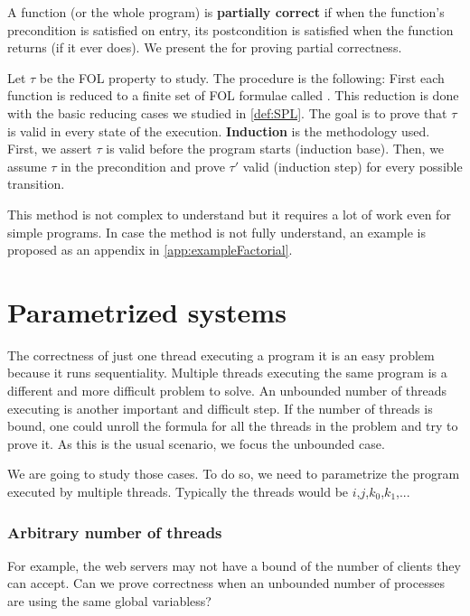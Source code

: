 A function (or the whole program) is \textbf{partially correct} if when the function's precondition is satisfied on entry, its postcondition is satisfied when the function returns (if it ever does).
%
We present the  for proving partial correctness.


Let $\tau$ be the \gls{FOL} property to study. 
%
The procedure is the following:
%
First each function is reduced to a finite set of \gls{FOL} formulae called .
%
This reduction is done with the basic reducing cases we studied in \ref{def:SPL}.
%
The goal is to prove that $\tau$ is valid in every state of the execution.
%
\textbf{Induction} is the methodology used.
%
First, we assert $\tau$ is valid before the program starts (induction base).
%
Then, we assume $\tau$ in the precondition and prove $\tau'$ valid (induction step) for every possible transition.

This method is not complex to understand but it requires a lot of work even for simple programs. 
%
In case the method is not fully understand, an example is proposed as an appendix in \ref{app:exampleFactorial}.



\section{Parametrized systems}

The correctness of just one thread executing a program it is an easy problem because it runs sequentiality.
%
Multiple threads executing the same program is a different and more difficult problem to solve.
%
An unbounded number of threads executing is another important and difficult step.
%
If the number of threads is bound, one could unroll the formula for all the threads in the problem and try to prove it. 
%
As this is the usual scenario, we focus the unbounded case.

We are going to study those cases. 
%
To do so, we need to parametrize the program executed by multiple threads.
%
Typically the threads would be $i$,$j$,$k_0$,$k_1$,... 
%
\subsubsection{Arbitrary number of threads}

For example, the web servers may not have a bound of the number of clients they can accept.
%
Can we prove correctness when an unbounded number of processes are using the same global variabless?

